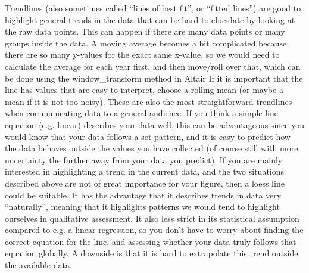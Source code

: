 \documentclass[8pt,landscape]{article}
\newcommand{\smalltext}[1]{%
  {\fontsize{8}{9}\selectfont\sloppy #1\par}%
}
\begin{document}
\begin{multicols}{3}
\smalltext{
Trendlines (also sometimes called “lines of best fit”, or “fitted lines”) are good to highlight general trends in the data that can be hard to elucidate by looking at the raw data points. This can happen if there are many data points or many groups inside the data.
A moving average becomes a bit complicated because there are so many y-values for the exact same x-value, so we would need to calculate the average for each year first, and then move/roll over that, which can be done using the window\_transform method in Altair
If it is important that the line has values that are easy to interpret, choose a rolling mean (or maybe a mean if it is not too noisy). These are also the most straightforward trendlines when communicating data to a general audience.
If you think a simple line equation (e.g. linear) describes your data well, this can be advantageous since you would know that your data follows a set pattern, and it is easy to predict how the data behaves outside the values you have collected (of course still with more uncertainty the further away from your data you predict).
If you are mainly interested in highlighting a trend in the current data, and the two situations described above are not of great importance for your figure, then a loess line could be suitable. It has the advantage that it describes trends in data very “naturally”, meaning that it highlights patterns we would tend to highlight ourselves in qualitative assessment. It also less strict in its statistical assumption compared to e.g. a linear regression, so you don’t have to worry about finding the correct equation for the line, and assessing whether your data truly follows that equation globally. A downside is that it is hard to extrapolate this trend outside the available data.
}



\end{multicols}
\end{document}
